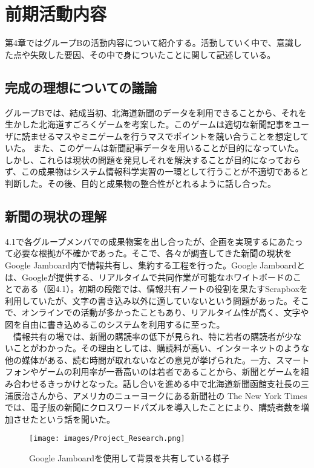 \chapter{前期活動内容}
第4章ではグループBの活動内容について紹介する。活動していく中で、意識した点や失敗した要因、その中で身についたことに関して記述している。
\section{完成の理想についての議論}
グループBでは、結成当初、北海道新聞のデータを利用できることから、それを生かした北海道すごろくゲームを考案した。このゲームは適切な新聞記事をユーザに読ませるマスやミニゲームを行うマスでポイントを競い合うことを想定していた。
また、このゲームは新聞記事データを用いることが目的になっていた。しかし、これらは現状の問題を発見しそれを解決することが目的になっておらず、この成果物はシステム情報科学実習の一環として行うことが不適切であると判断した。その後、目的と成果物の整合性がとれるように話し合った。
\section{新聞の現状の理解}
4.1で各グループメンバでの成果物案を出し合ったが、企画を実現するにあたって必要な根拠が不確かであった。そこで、各々が調査してきた新聞の現状をGoogle Jamboard内で情報共有し、集約する工程を行った。Google Jamboardとは、Googleが提供する、リアルタイムで共同作業が可能なホワイトボードのことである（図4.1）。初期の段階では、情報共有ノートの役割を果たすScrapboxを利用していたが、文字の書き込み以外に適していないという問題があった。そこで、オンラインでの活動が多かったこともあり、リアルタイム性が高く、文字や図を自由に書き込めるこのシステムを利用するに至った。\\
　情報共有の場では、新聞の購読率の低下が見られ、特に若者の購読者が少ないことがわかった。その理由としては、購読料が高い、インターネットのような他の媒体がある、読む時間が取れないなどの意見が挙げられた。一方、スマートフォンやゲームの利用率が一番高いのは若者であることから、新聞とゲームを組み合わせるきっかけとなった。話し合いを進める中で北海道新聞函館支社長の三浦辰治さんから、アメリカのニューヨークにある新聞社の The New York Times では、電子版の新聞にクロスワードパズルを導入したことにより、購読者数を増加させたという話を聞いた。
\newpage
\begin{figure}[htbp]
    \centering
    \texttt{[image: images/Project\_Research.png]}
    \caption{Google Jamboardを使用して背景を共有している様子}
    \label{fig:my_label}
\end{figure}

